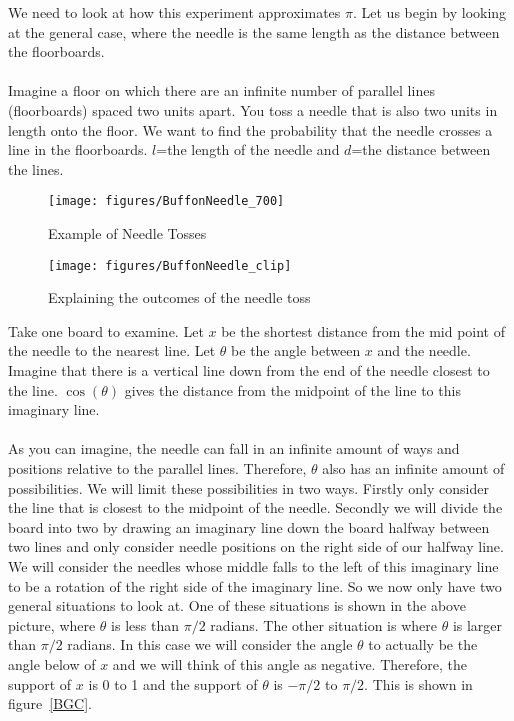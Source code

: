 We need to look at how this experiment approximates $\pi$. Let us begin by looking at the general case, where the needle is the same length as the distance between the floorboards.
\\
\\
Imagine a floor on which there are an infinite number of parallel lines (floorboards) spaced two units apart. You toss a needle that is also two units in length onto the floor. We want to find the probability that the needle crosses a line in the floorboards. $l$=the length of the needle and $d$=the distance between the lines.
\\
\begin{figure}[h]
\begin{center}
\texttt{[image: figures/BuffonNeedle\_700]}
\caption{Example of Needle Tosses}
\end{center}
\end{figure}


\begin{figure}[h]
\begin{center}
\texttt{[image: figures/BuffonNeedle\_clip]}
\caption{Explaining the outcomes of the needle toss}
\end{center}
\end{figure}

\noindent
Take one board to examine. Let $x$ be the shortest distance from the mid point of the needle to the nearest line. Let $\theta$ be the angle between $x$ and the needle. Imagine that there is a vertical line down from the end of the needle closest to the line. $\cos(\theta)$ gives the distance from the midpoint of the line to this imaginary line.\\
\\
As you can imagine, the needle can fall in an infinite amount of ways and positions relative to the parallel lines. Therefore, $\theta$ also has an infinite amount of possibilities. We will limit these possibilities in two ways. Firstly only consider the line that is closest to the midpoint of the needle. Secondly we will divide the board into two by drawing an imaginary line down the board halfway between two lines and only consider needle positions on the right side of our halfway line. We will consider the needles whose middle falls to the left of this imaginary line to be a rotation of the right side of the imaginary line. So we now only have two general situations to look at. One of these situations is shown in the above picture, where $\theta$ is less than $\pi/2$ radians. The other situation is where $\theta$ is larger than $\pi/2$ radians. In this case we will consider the angle $\theta$ to actually be the angle below of $x$ and we will think of this angle as negative. Therefore, the support of $x$ is 0 to 1 and the support of $\theta$ is $-\pi/2$ to $\pi/2$. This is shown in figure~\ref{BGC}.\\


